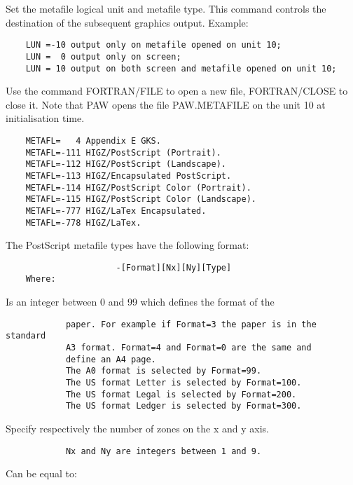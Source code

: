    \par
Set the metafile logical unit and metafile type.  This command controls the 
   destination of the subsequent graphics output.  Example:  
\begin{verbatim}
    LUN =-10 output only on metafile opened on unit 10;
    LUN =  0 output only on screen;
    LUN = 10 output on both screen and metafile opened on unit 10;
\end{verbatim}
   \par
Use the command FORTRAN/FILE to open a new file, FORTRAN/CLOSE to close it. 
   Note that PAW opens the file PAW.METAFILE on the unit 10 at initialisation 
   time.  
\begin{verbatim}
    METAFL=   4 Appendix E GKS.
    METAFL=-111 HIGZ/PostScript (Portrait).
    METAFL=-112 HIGZ/PostScript (Landscape).
    METAFL=-113 HIGZ/Encapsulated PostScript.
    METAFL=-114 HIGZ/PostScript Color (Portrait).
    METAFL=-115 HIGZ/PostScript Color (Landscape).
    METAFL=-777 HIGZ/LaTex Encapsulated.
    METAFL=-778 HIGZ/LaTex.
\end{verbatim}
   \par
The PostScript metafile types have the following format:  
\begin{verbatim}
                      -[Format][Nx][Ny][Type]
    Where:
\end{verbatim}
   \par
[Format] Is an integer between 0 and 99 which defines the format of the 
\begin{verbatim}
            paper. For example if Format=3 the paper is in the standard
            A3 format. Format=4 and Format=0 are the same and
            define an A4 page.
            The A0 format is selected by Format=99.
            The US format Letter is selected by Format=100.
            The US format Legal is selected by Format=200.
            The US format Ledger is selected by Format=300.
\end{verbatim}
   \par
[Nx, Ny] Specify respectively the number of zones on the x and y axis.  
\begin{verbatim}
            Nx and Ny are integers between 1 and 9.
\end{verbatim}
   \par
[Type]   Can be equal to:  
